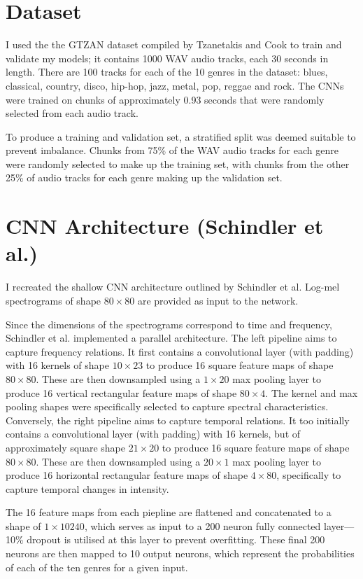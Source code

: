 \documentclass[conference]{IEEEtran}
\begin{document}
\section{Dataset}

I used the the GTZAN dataset compiled by Tzanetakis and Cook \cite{TzanetakisCook} to train and validate my models; it contains 1000 WAV audio tracks, each 30 seconds in length.
There are 100 tracks for each of the 10 genres in the dataset: blues, classical, country, disco, hip-hop, jazz, metal, pop, reggae and rock.
The CNNs were trained on chunks of approximately 0.93 seconds that were randomly selected from each audio track.

To produce a training and validation set, a stratified split was deemed suitable to prevent imbalance.
Chunks from 75\% of the WAV audio tracks for each genre were randomly selected to make up the training set, with chunks from the other 25\% of audio tracks for each genre making up the validation set.

\section{CNN Architecture (Schindler et al.)}

I recreated the shallow CNN architecture outlined by Schindler et al.
Log-mel spectrograms of shape $80\times80$ are provided as input to the network.

Since the dimensions of the spectrograms correspond to time and frequency, Schindler et al. implemented a parallel architecture.
The left pipeline aims to capture frequency relations.
It first contains a convolutional layer (with padding) with 16 kernels of shape $10\times23$ to produce 16 square feature maps of shape $80\times80$.
These are then downsampled using a $1\times20$ max pooling layer to produce 16 vertical rectangular feature maps of shape $80\times4$.
The kernel and max pooling shapes were specifically selected to capture spectral characteristics.
Conversely, the right pipeline aims to capture temporal relations.
It too initially contains a convolutional layer (with padding) with 16 kernels, but of approximately square shape $21\times20$ to produce 16 square feature maps of shape $80\times80$.
These are then downsampled using a $20\times1$ max pooling layer to produce 16 horizontal rectangular feature maps of shape $4\times80$, specifically to capture temporal changes in intensity.

The 16 feature maps from each piepline are flattened and concatenated to a shape of $1\times10240$, which serves as input to a 200 neuron fully connected layer---10\% dropout is utilised at this layer to prevent overfitting.
These final 200 neurons are then mapped to 10 output neurons, which represent the probabilities of each of the ten genres for a given input.
\end{document}
